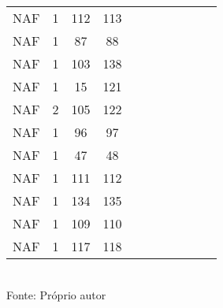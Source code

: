 \begin{table}[H]
{\begin{tabular}{ccccccccccc}
NAF & 1 & 112 & 113 &  &  &  &  &  &  &  \\
NAF & 1 & 87 & 88 &  &  &  &  &  &  &  \\
NAF & 1 & 103 & 138 &  &  &  &  &  &  &  \\
NAF & 1 & 15 & 121 &  &  &  &  &  &  &  \\
NAF & 2 & 105 & 122 &  &  &  &  &  &  &  \\
NAF & 1 & 96 & 97 &  &  &  &  &  &  &  \\
NAF & 1 & 47 & 48 &  &  &  &  &  &  &  \\
NAF & 1 & 111 & 112 &  &  &  &  &  &  &  \\
NAF & 1 & 134 & 135 &  &  &  &  &  &  &  \\
NAF & 1 & 109 & 110 &  &  &  &  &  &  &  \\
NAF & 1 & 117 & 118 &  &  &  &  &  &  &  \\
\bottomrule
\end{tabular}}
\\Fonte: Próprio autor
\end{table}



